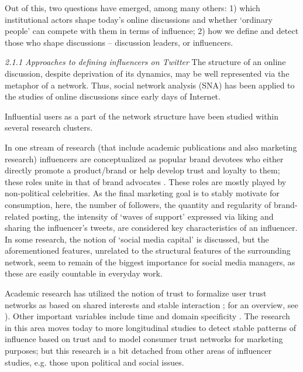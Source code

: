 Out of this, two questions have emerged, among many others: 1) which institutional actors shape today’s online discussions and whether ‘ordinary people’ can compete with them in terms of influence; 2) how we define and detect those who shape discussions – discussion leaders, or influencers.

\textit{2.1.1 Approaches to defining influencers on Twitter}
The structure of an online discussion, despite deprivation of its dynamics, may be well represented via the metaphor of a network. Thus, social network analysis (SNA) has been applied to the studies of online discussions since early days of Internet.

Influential users as a part of the network structure have been studied within several research clusters.

In one stream of research (that include academic publications and also marketing research) influencers are conceptualized as popular brand devotees who either directly promote a product/brand or help develop trust and loyalty to them; these roles unite in that of brand advocates \cite{Aquino}. These roles are mostly played by non-political celebrities. As the final marketing goal is to stably motivate for consumption, here, the number of followers, the quantity and regularity of brand-related posting, the intensity of ‘waves of support’ expressed via liking and sharing the influencer’s tweets, are considered key characteristics of an influencer. In some research, the notion of ‘social media capital’ \cite{FrebergGrahamMcGaughey,SajuriaVanHeerdeHudsonHudson} is discussed, but the aforementioned features, unrelated to the structural features of the surrounding network, seem to remain of the biggest importance for social media managers, as these are easily countable in everyday work.

Academic research has utilized the notion of trust to formalize user trust networks as based on shared interests and stable interaction \cite{KimTran}; for an overview, see \cite{LiuJiangLin}). Other important variables include time and domain specificity \cite{LiuJiangLin}. The research in this area moves today to more longitudinal studies to detect stable patterns of influence based on trust and to model consumer trust networks for marketing purposes; but this research is a bit detached from other areas of influencer studies, e.g. those upon political and social issues.

